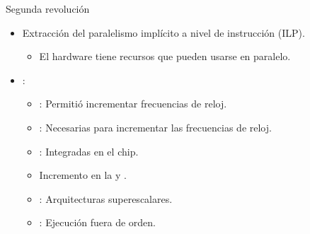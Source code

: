 \begin{frame}[t]{Segunda revolución}
\begin{itemize}
  \item Extracción del paralelismo implícito a nivel de instrucción (ILP).
    \begin{itemize}
      \item El hardware tiene recursos que pueden usarse en paralelo.
    \end{itemize}
  \pause
  \item {}:
    \begin{itemize}[<+->]
      \item {}: Permitió incrementar frecuencias de reloj.
      \item {}: Necesarias para incrementar las frecuencias de reloj.
      \item {}: Integradas en el chip.
      \item Incremento en la  y .
      \item {}: Arquitecturas superescalares.
      \item {}: Ejecución fuera de orden.
    \end{itemize}
\end{itemize}
\end{frame}

